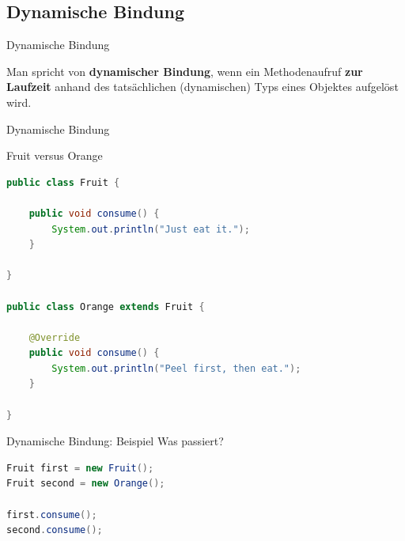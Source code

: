 \documentclass[18pt]{beamer}
\begin{document}
\subsection{Dynamische Bindung}

\begin{frame}{Dynamische Bindung}
    \begin{block}{}
        Man spricht von \textbf{dynamischer Bindung}, wenn ein Methodenaufruf \textbf{zur Laufzeit} anhand
        des tatsächlichen (dynamischen) Typs eines Objektes aufgelöst wird.
    \end{block}

\end{frame}


\begin{frame}[fragile]{Dynamische Bindung}
    \begin{exampleblock}{Fruit versus Orange}
        \begin{lstlisting}[language=Java,basicstyle=\scriptsize]
public class Fruit {

    public void consume() {
        System.out.println("Just eat it.");
    }

}

public class Orange extends Fruit {

    @Override
    public void consume() {
        System.out.println("Peel first, then eat.");
    }

}
        \end{lstlisting}

    \end{exampleblock}

\end{frame}

\begin{frame}[fragile]{Dynamische Bindung: Beispiel}
    Was passiert?
    \begin{exampleblock}{}
        \begin{lstlisting}[language=Java]
Fruit first = new Fruit();
Fruit second = new Orange();

first.consume();
second.consume();
        \end{lstlisting}

    \end{exampleblock}

\end{frame}
\end{document}
